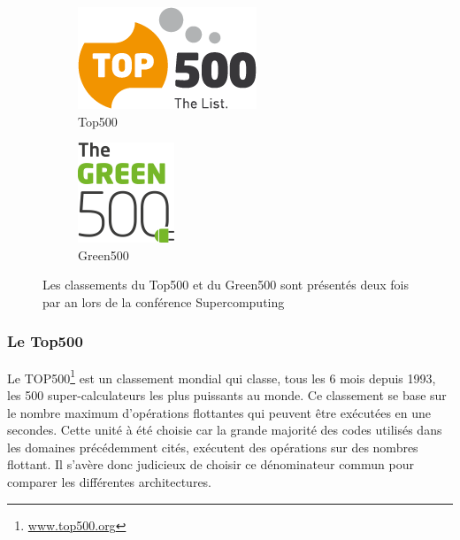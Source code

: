         \begin{figure}[t!]
                \centering
                \begin{subfigure}[t]{0.48\textwidth}
                    \centering
                    \includegraphics[width=.4\linewidth]{images/Top500_logo.png}
                    \caption{\label{fig:Top500_logo}Top500}
                \end{subfigure}\hfill
            \begin{subfigure}[t]{0.48\textwidth}
                    \centering
                    \includegraphics[width=.25\linewidth]{images/Green500_logo.png}
                    \caption{\label{fig:Green500_logo}Green500}
            \end{subfigure}
            \caption{\label{fig:Top500} Les classements du Top500 et du Green500 sont présentés deux fois par an lors de la conférence Supercomputing\protect\footnotemark}
        \end{figure}
        
    
    \subsubsection{Le Top500}
        
        Le TOP500\footnote{\url{www.top500.org}} est un classement mondial qui classe, tous les 6 mois depuis 1993, les 500 super-calculateurs les plus puissants au monde. Ce classement se base sur le nombre maximum d'opérations flottantes qui peuvent être exécutées en une secondes. Cette unité à été choisie car la grande majorité des codes utilisés dans les domaines précédemment cités, exécutent des opérations sur des nombres flottant. Il s'avère donc judicieux de choisir ce dénominateur commun pour comparer les différentes architectures.
        
